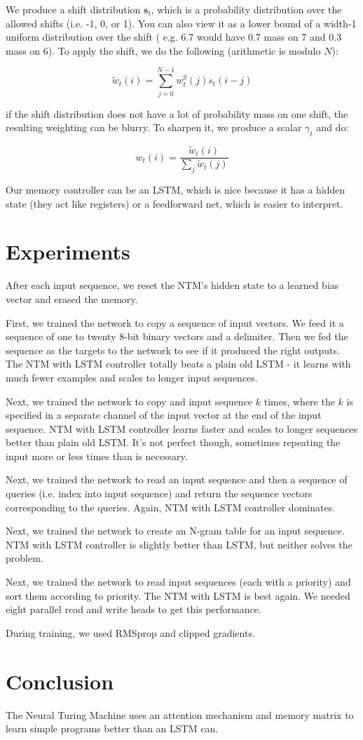 \documentclass[a4paper]{article}
\begin{document}
We produce a shift distribution $\mathbf{s}_t$, which is a probability
distribution over the allowed shifts (i.e. -1, 0, or 1). You can also
view it as a lower bound of a width-1 uniform distribution over the shift (
e.g. 6.7 would have 0.7 mass on 7 and 0.3 mass on 6). To apply the shift,
we do the following (arithmetic is modulo $N$):

$$
\tilde{w}_t(i) = \sum_{j=0}^{N-1}{w_t^g(j) s_t(i-j)}
$$

if the shift distribution does not have a lot of probability mass on one
shift, the resulting weighting can be blurry. To sharpen it, we produce a scalar
$\gamma_t$ and do:

$$
w_t(i) = \frac{\tilde{w}_t(i)}{\sum_{j}{\tilde{w}_t(j)}}
$$

Our memory controller can be an LSTM, which is nice because it has a hidden
state (they act like registers) or a feedforward net, which is easier to
interpret.

\section{Experiments}
After each input sequence, we reset the NTM's hidden state to a learned bias
vector and erased the memory.

First, we trained the network to copy a sequence of input vectors. We feed it
a sequence of one to twenty 8-bit binary vectors and a delimiter. Then we fed
the sequence as the targets to the network to see if it produced the right
outputs. The NTM with LSTM controller totally beats a plain old LSTM - it learns
with much fewer examples and scales to longer input sequences.

Next, we trained the network to copy and input sequence $k$ times, where the
$k$ is specified in a separate channel of the input vector at the end of
the input sequence. NTM with LSTM controller learns faster and scales to
longer sequences better than plain old LSTM. It's not perfect though,
sometimes repeating the input more or less times than is necessary.

Next, we trained the network to read an input sequence and then a sequence of
queries (i.e. index into input sequence) and return the sequence vectors
corresponding to the queries. Again, NTM with LSTM controller dominates.

Next, we trained the network to create an N-gram table for an input sequence.
NTM with LSTM controller is slightly better than LSTM, but neither solves
the problem.

Next, we trained the network to read input sequences (each with a priority)
and sort them according to priority. The NTM with LSTM is best again. We needed
eight parallel read and write heads to get this performance.

During training, we used RMSprop and clipped gradients.

\section{Conclusion}
The Neural Turing Machine uses an attention mechanism and memory matrix
to learn simple programs better than an LSTM can.
\end{document}
